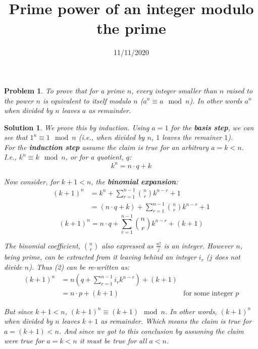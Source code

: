 \documentclass{article}
\title{Prime power of an integer modulo the prime}
\date{11/11/2020}
\newtheorem*{problem*}{Problem}
\newtheorem*{solution*}{Solution}
\begin{document}
\maketitle
 
\begin{problem*}
    To prove that for a prime $n$, every 
    integer smaller than $n$
    raised to the power $n$ is equivalent to itself
    modulo $n$ ($a^n \equiv a\mod{n}$).
    In other words $a^n$ when divided by $n$
    leaves $a$ as remainder.
\end{problem*}

\begin{solution*}
    We prove this by induction. Using $a=1$ for the 
    \textbf{basis step}, we can see that $1^n \equiv 1\mod{n}$
    (i.e., when divided by $n$, $1$ leaves the remainer $1$).\\

    For the \textbf{induction step} assume the claim is 
    true for an arbitrary $a=k<n$. I.e., $k^n \equiv k\mod{n}$, 
    or for a quotient, $q$:
    \begin{equation}
        k^n = n\cdot{q} + k
    \end{equation}

    Now consider, for $k+1<n$, the \textbf{binomial expansion}:
    \begin{align*}
        (k+1)^n
        &= k^n + \sum_{r=1}^{n-1}{n\choose{r}}k^{n-r} + 1\\
        &= (n\cdot{q} + k) + \sum_{r=1}^{n-1}{n\choose{r}}k^{n-r} + 1
    \end{align*}
    \begin{equation}
        (k+1)^n = n\cdot{q} + \sum_{r=1}^{n-1}{n\choose{r}}k^{n-r} + (k+1)
    \end{equation}
    
    The binomial coefficient, $n\choose{r}$
    also expressed as $\frac{n!}{j}$ is an integer.
    However $n$, being prime, can be extracted from 
    it leaving behind an integer $i_r$ ($j$ does not divide $n$).
    Thus (2) can be re-written as:
    \begin{align*}
        (k+1)^n
        &= n \left(q + \sum_{r=1}^{n-1}{i_r}k^{n-r} \right) + (k+1)\\
        &= n\cdot{p} + (k+1) & \text{for some integer $p$}
    \end{align*}

    But since $k+1<n$, $(k+1)^n \equiv (k+1)\mod{n}$. 
    In other words, $(k+1)^n$ when divided by $n$
    leaves $k+1$ as remainder. Which means the claim is
    true for $a=(k+1)<n$. And since we got to this conclusion
    by assuming the claim were true for $a=k<n$ 
    it must be true for all $a<n$.
\end{solution*}
\end{document}
